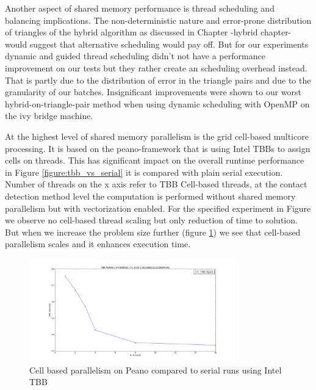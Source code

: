 Another aspect of shared memory performance is thread scheduling and balancing implications. The non-deterministic nature and error-prone distribution of triangles of the hybrid algorithm as discussed in Chapter {-hybrid chapter-} would suggest that alternative scheduling would pay off. But for our experiments dynamic and guided thread scheduling didn't not have a performance improvement on our tests but they rather create an scheduling overhead instead. That is partly due to the distribution of error in the triangle pairs and due to the granularity of our batches. Insignificant improvements were shown to our worst hybrid-on-triangle-pair method when using dynamic scheduling with OpenMP on the ivy bridge machine.    

At the highest level of shared memory parallelism is the grid cell-based multicore processing. It is based on the peano-framework that is using Intel TBBs to assign cells on threads. This has significant impact on the overall runtime performance in Figure \ref{figure:tbb_vs_serial} it is compared with plain serial execution. Number of threads on the x axis refer to TBB Cell-based threads, at the contact detection method level the computation is performed without shared memory parallelism but with vectorization enabled. For the specified experiment in Figure {} we observe no cell-based thread scaling but only reduction of time to solution. But when we increase the problem size further (figure \ref{figure:tbb_scaling}) we see that cell-based parallelism scales and it enhances execution time. 

\begin{figure}[htb]
  \begin{center}
    \includegraphics[width=0.8\textwidth]{experiments/random/omp/tbb_regular_x2.png}
  \end{center}
  \caption{Cell based parallelism on Peano compared to serial runs using Intel TBB}
  \label{figure:tbb_scaling}
\end{figure}

